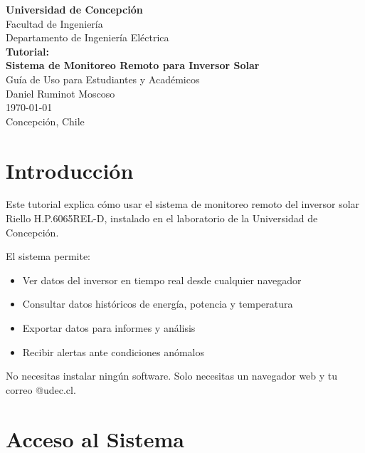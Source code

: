 \documentclass[12pt,a4paper]{article}
\begin{document}
\begin{titlepage}
    \centering
    \vspace*{2cm}
    {\Huge\bfseries Universidad de Concepci\'on}\\[1cm]
    {\Large Facultad de Ingenier\'ia\\Departamento de Ingenier\'ia El\'ectrica}\\[2cm]

    {\Huge\bfseries Tutorial:\\Sistema de Monitoreo Remoto para Inversor Solar}\\[1cm]
    {\Large Gu\'ia de Uso para Estudiantes y Acad\'emicos}\\[2cm]

    {\large Daniel Ruminot Moscoso}\\[2cm]

    {\large \today}\\[1cm]
    {\large Concepci\'on, Chile}
\end{titlepage}

\tableofcontents
\newpage

\section{Introducci\'on}

Este tutorial explica c\'omo usar el sistema de monitoreo remoto del inversor solar Riello H.P.6065REL-D, instalado en el laboratorio de la Universidad de Concepci\'on.

El sistema permite:
\begin{itemize}
    \item Ver datos del inversor en tiempo real desde cualquier navegador
    \item Consultar datos hist\'oricos de energ\'ia, potencia y temperatura
    \item Exportar datos para informes y an\'alisis
    \item Recibir alertas ante condiciones an\'omalos
\end{itemize}

\begin{infobox}
No necesitas instalar ning\'un software. Solo necesitas un navegador web y tu correo @udec.cl.
\end{infobox}

\section{Acceso al Sistema}
\end{document}
